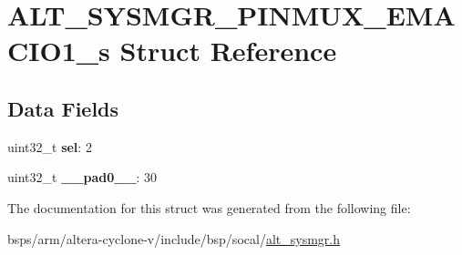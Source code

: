 \hypertarget{structALT__SYSMGR__PINMUX__EMACIO1__s}{}\section{A\+L\+T\+\_\+\+S\+Y\+S\+M\+G\+R\+\_\+\+P\+I\+N\+M\+U\+X\+\_\+\+E\+M\+A\+C\+I\+O1\+\_\+s Struct Reference}
\label{structALT__SYSMGR__PINMUX__EMACIO1__s}
\subsection*{Data Fields}
\begin{DoxyCompactItemize}
\item 
\mbox{\label{structALT__SYSMGR__PINMUX__EMACIO1__s_ab6818415ae7f6bc0ba706a28ad0b01e6}} 
uint32\+\_\+t {\bfseries sel}\+: 2
\item 
\mbox{\label{structALT__SYSMGR__PINMUX__EMACIO1__s_abaa17dda1732accbeca3affc9673382b}} 
uint32\+\_\+t {\bfseries \+\_\+\+\_\+pad0\+\_\+\+\_\+}\+: 30
\end{DoxyCompactItemize}


The documentation for this struct was generated from the following file\+:\begin{DoxyCompactItemize}
\item 
bsps/arm/altera-\/cyclone-\/v/include/bsp/socal/\mbox{\hyperlink{alt__sysmgr_8h}{alt\+\_\+sysmgr.\+h}}\end{DoxyCompactItemize}
